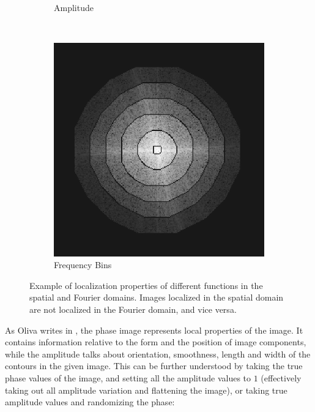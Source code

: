 \documentclass{report}
\begin{document}
\begin{figure}[H]
\begin{subfigure}[b]{0.2\textwidth}
                \caption{Amplitude}
                \label{fig:tiger}
        \end{subfigure}
        ~
        \begin{subfigure}[b]{0.2\textwidth}
                \includegraphics[width=\textwidth]{graphics/freq_bins.png}
                \caption{Frequency Bins}
                \label{fig:mouse}
        \end{subfigure}
        \caption{Example of localization properties of different functions in the spatial and Fourier domains. Images localized in the spatial domain are not localized in the Fourier domain, and vice versa.}\label{fig:fft_localization}
\end{figure}
As Oliva writes in \cite{gist_descriptor}, the phase image represents local properties of the image. It contains information relative to the form and the position of image components, while the amplitude talks about orientation, smoothness,
length and width of the contours in the given image. This can be further understood by taking the true phase values of the image, and setting all the amplitude values to $1$ (effectively taking out all amplitude variation and flattening the image), or taking true amplitude values and randomizing the phase:
\end{document}
